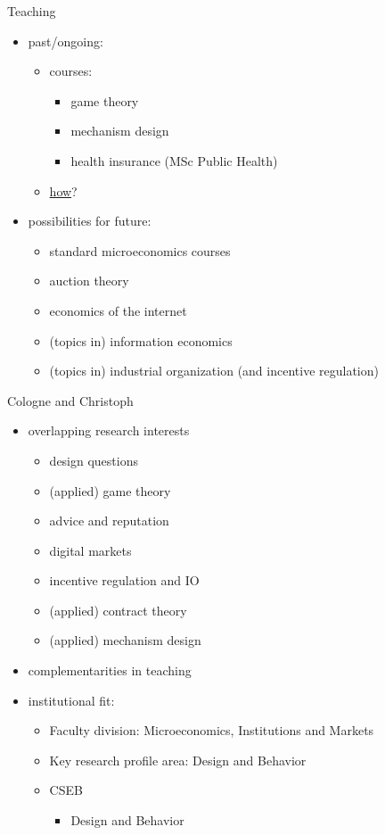 \documentclass[bigger]{beamer}
\begin{document}
\begin{frame}[label={sec:orgc226fc5}]{Teaching}
\begin{itemize}
\item past/ongoing:
\begin{itemize}
\item courses:
\begin{itemize}
\item game theory
\item mechanism design
\item health insurance (MSc Public Health)
\end{itemize}
\item \href{./gt2016.html}{how}?
\end{itemize}
\end{itemize}

\pause

\begin{itemize}
\item possibilities for future: 
\begin{itemize}
\item standard microeconomics courses
\item auction theory
\item economics of the internet
\item (topics in) information economics
\item (topics in) industrial organization (and incentive regulation)
\end{itemize}
\end{itemize}
\end{frame}

\begin{frame}[label={sec:org5a72ce3}]{Cologne and Christoph}
\begin{itemize}
\item overlapping research interests 
\begin{itemize}
\item design questions
\item (applied) game theory
\item advice and reputation
\item digital markets
\item incentive regulation and IO
\item (applied) contract theory
\item (applied) mechanism design
\end{itemize}

\item complementarities in teaching
\item institutional fit:
\begin{itemize}
\item Faculty division: Microeconomics, Institutions and Markets
\item Key research profile area: Design and Behavior
\item CSEB 
\begin{itemize}
\item Design and Behavior
\end{itemize}
\end{itemize}
\end{itemize}
\end{frame}
\end{document}

